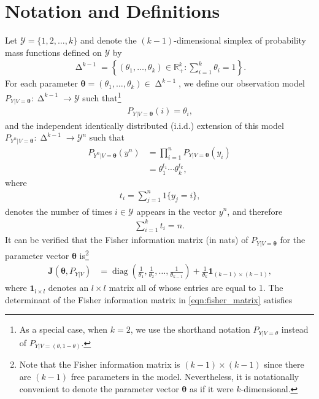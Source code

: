 \documentclass[journal, 10pt]{IEEEtran}
\newcommand{\bbR}{\mathbb{R}}
\newcommand{\bfJ}{\mathbf{J}}
\newcommand{\cY}{\mathcal{Y}}
\theoremstyle{plain}
\theoremstyle{plain}
\theoremstyle{plain}
\theoremstyle{plain}
\newcommand{\boldtheta}{\mathbold{\theta}}
\newcommand{\diag}{\operatorname{diag}}
\newcommand{\simplex}{\operatorname{\Delta}}
\begin{document}
\section{Notation and Definitions}\label{sec:notation}
Let $\cY=\{1, 2, \hdots, k \}$ and denote the $(k-1)$-dimensional simplex of probability mass functions defined on $\cY$ by
\begin{align}
	\simplex^{k-1}=\left\{(\theta_1, \hdots, \theta_k)\in \bbR_+^k \colon \sum_{i=1}^{k}\theta_i = 1\right\}\text{.}
\end{align}
For each parameter $\boldtheta=(\theta_1, \hdots, \theta_k ) \in \simplex^{k-1}$, we define our observation model $P_{Y|V=\boldtheta}\colon \simplex^{k-1} \to \cY$ such that\footnote{As a special case, when $k=2$, we use the shorthand notation $P_{Y|V=\theta}$ instead of $P_{Y|V=(\theta,1-\theta)}$.}
\begin{align}
	P_{Y|V=\boldtheta}(i)=\theta_i\text{,}
\end{align}
and the independent identically distributed (i.i.d.) extension of this model $ P_{Y^n|V=\boldtheta}\colon  \simplex^{k-1}\to \cY^n $ such that
\begin{align}
P_{Y^n|V=\boldtheta}(y^n)&=\prod_{i=1}^{n}P_{Y|V=\boldtheta}(y_i) \\
&=\theta_1^{t_1} \cdots \theta_k^{t_k}\text{,} \label{eqn:model}
\end{align}
where
\begin{align}
	t_i=\sum_{j=1}^{n}1\{y_j=i\}\text{,} \label{eqn:type}
\end{align}
denotes the number of times $i\in \cY$ appears in the vector $y^n$, and therefore
\begin{align}
	\sum_{i=1}^{k}t_i=n\text{.}
\end{align}
It can be verified that the Fisher information matrix (in nats) of $P_{Y|V=\boldtheta}$ for the parameter vector $\boldtheta$ is\footnote{Note that the Fisher information matrix is $(k-1)\times (k-1)$ since there are $(k-1)$ free parameters in the model. Nevertheless, it is notationally convenient to denote the parameter vector $\boldtheta $ as if it were $k$-dimensional.}
\begin{align}
	\bfJ(\boldtheta, P_{Y|V} )&=\diag\left( \frac{1}{\theta_1}, \frac{1}{\theta_2}, \hdots, \frac{1}{ \theta_{k-1}} \right)+\frac{1}{\theta_k}\mathbf{1}_{(k-1)\times(k-1)}\text{,} \label{eqn:fisher_matrix}
\end{align}
where $\mathbf{1}_{l\times l} $ denotes an $l \times l $ matrix all of whose entries are equal to 1. The determinant of the Fisher information matrix in \eqref{eqn:fisher_matrix} satisfies
\end{document}
